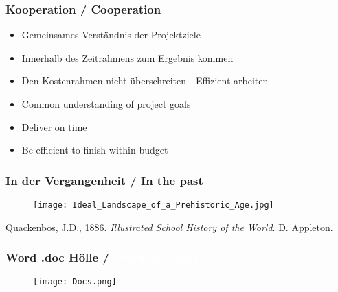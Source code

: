 \documentclass{beamer}
\begin{document}
\begin{frame}
  \frametitle{Kooperation / \textcolor{mfn_green}{Cooperation}}

  \begin{itemize}
  \item{Gemeinsames Verständnis der Projektziele}
  \item{Innerhalb des Zeitrahmens zum Ergebnis kommen}
  \item{Den Kostenrahmen nicht überschreiten - Effizient arbeiten}
  \end{itemize}
  
  \begin{itemize}
  \item{\textcolor{mfn_green}{Common understanding of project goals}}
  \item{\textcolor{mfn_green}{Deliver on time}}
  \item{\textcolor{mfn_green}{Be efficient to finish within budget}}
  \end{itemize}
\end{frame}

\begin{frame}
  \frametitle{In der Vergangenheit / \textcolor{mfn_green}{In the past}}
  \begin{figure}
    \texttt{[image: Ideal\_Landscape\_of\_a\_Prehistoric\_Age.jpg]}
  \end{figure}
  \begin{center}{\tiny Quackenbos, J.D., 1886. \textit{Illustrated School History of the World}. D. Appleton.}\end{center}
\end{frame}

{
\begin{frame}
  \frametitle{Word\textsuperscript{\tiny\textregistered} .doc Hölle /
    \textcolor{white}{Word\textsuperscript{\tiny\textregistered} .doc hell}}
  \begin{figure}
  \texttt{[image: Docs.png]}
  \end{figure}
\end{frame}
}
\end{document}
